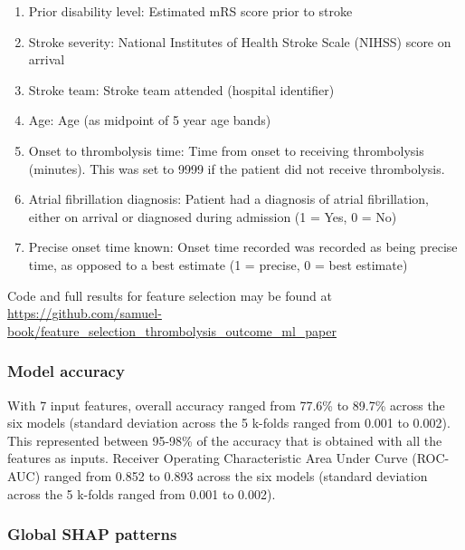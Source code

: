 \begin{enumerate}
    \item Prior disability level: Estimated mRS score prior to stroke
    \item Stroke severity: National Institutes of Health Stroke Scale (NIHSS) score on arrival
    \item Stroke team: Stroke team attended (hospital identifier)
    \item Age: Age (as midpoint of 5 year age bands)
    \item Onset to thrombolysis time: Time from onset to receiving thrombolysis (minutes). This was set to 9999 if the patient did not receive thrombolysis.
    \item Atrial fibrillation diagnosis: Patient had a diagnosis of atrial fibrillation, either on arrival or diagnosed during admission (1 = Yes, 0 = No)
    \item Precise onset time known: Onset time recorded was recorded as being precise time, as opposed to a best estimate (1 = precise, 0 = best estimate)
\end{enumerate}

Code and full results for feature selection may be found at \url{https://github.com/samuel-book/feature_selection_thrombolysis_outcome_ml_paper}

\subsubsection{Model accuracy}

With 7 input features, overall accuracy ranged from 77.6\% to 89.7\% across the six models (standard deviation across the 5 k-folds ranged from 0.001 to 0.002). This represented between 95-98\% of the accuracy that is obtained with all the features as inputs. Receiver Operating Characteristic Area Under Curve (ROC-AUC) ranged from 0.852 to 0.893 across the six models (standard deviation across the 5 k-folds ranged from 0.001 to 0.002).

\subsubsection{Global SHAP patterns}


